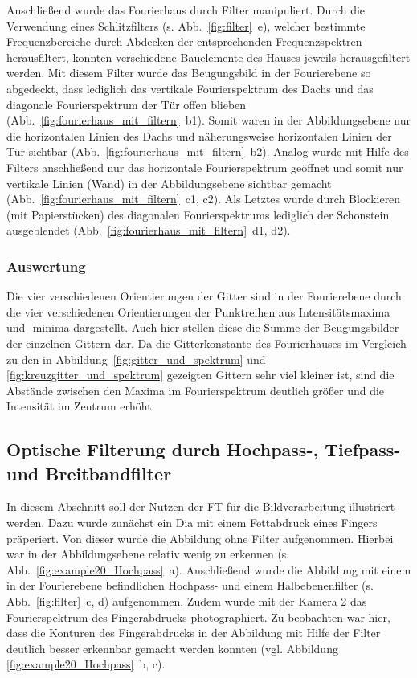 Anschließend wurde das Fourierhaus durch Filter manipuliert. Durch die Verwendung eines Schlitzfilters (s. Abb.~\ref{fig:filter}~e), welcher bestimmte Frequenzbereiche durch Abdecken der entsprechenden Frequenzspektren herausfiltert, konnten verschiedene Bauelemente des Hauses jeweils herausgefiltert werden. Mit diesem Filter wurde das Beugungsbild in der Fourierebene so abgedeckt, dass lediglich das vertikale Fourierspektrum des Dachs und das diagonale Fourierspektrum der Tür offen blieben (Abb.~\ref{fig:fourierhaus_mit_filtern}~b1). Somit waren in der Abbildungsebene nur die horizontalen Linien des Dachs und näherungsweise horizontalen Linien der Tür sichtbar (Abb.~\ref{fig:fourierhaus_mit_filtern}~b2). Analog wurde mit Hilfe des Filters anschließend nur das horizontale Fourierspektrum geöffnet und somit nur vertikale Linien (Wand) in der Abbildungsebene sichtbar gemacht (Abb.~\ref{fig:fourierhaus_mit_filtern}~c1, c2). Als Letztes wurde durch Blockieren (mit Papierstücken) des diagonalen Fourierspektrums lediglich der Schonstein ausgeblendet (Abb.~\ref{fig:fourierhaus_mit_filtern}~d1, d2).

\subsubsection*{Auswertung}
Die vier verschiedenen Orientierungen der Gitter sind in der Fourierebene durch die vier verschiedenen Orientierungen der Punktreihen aus Intensitätsmaxima und -minima dargestellt. Auch hier stellen diese die Summe der Beugungsbilder der einzelnen Gittern dar. Da die Gitterkonstante des Fourierhauses im Vergleich zu den in Abbildung~\ref{fig:gitter_und_spektrum} und \ref{fig:kreuzgitter_und_spektrum} gezeigten Gittern sehr viel kleiner ist, sind die Abstände zwischen den Maxima im Fourierspektrum deutlich größer und die Intensität im Zentrum erhöht.


\subsection{Optische Filterung durch Hochpass-, Tiefpass- und Breitbandfilter}

In diesem Abschnitt soll der Nutzen der FT für die Bildverarbeitung illustriert werden. Dazu wurde zunächst ein Dia mit einem Fettabdruck eines Fingers präperiert. Von dieser wurde die Abbildung ohne Filter aufgenommen. Hierbei war in der Abbildungsebene relativ wenig zu erkennen (s. Abb.~\ref{fig:example20_Hochpass}~a). Anschließend wurde die Abbildung mit einem in der Fourierebene befindlichen Hochpass- und einem Halbebenenfilter (s. Abb.~\ref{fig:filter}~c, d) aufgenommen. Zudem wurde mit der Kamera 2 das Fourierspektrum des Fingerabdrucks photographiert. Zu beobachten war hier, dass die Konturen des Fingerabdrucks in der Abbildung mit Hilfe der Filter deutlich besser erkennbar gemacht werden konnten (vgl. Abbildung \ref{fig:example20_Hochpass}~b, c).

